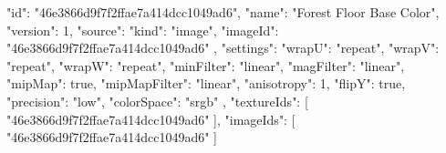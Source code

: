 {
  "id": "46e3866d9f7f2ffae7a414dcc1049ad6",
  "name": "Forest Floor Base Color",
  "version": 1,
  "source": {
    "kind": "image",
    "imageId": "46e3866d9f7f2ffae7a414dcc1049ad6"
  },
  "settings": {
    "wrapU": "repeat",
    "wrapV": "repeat",
    "wrapW": "repeat",
    "minFilter": "linear",
    "magFilter": "linear",
    "mipMap": true,
    "mipMapFilter": "linear",
    "anisotropy": 1,
    "flipY": true,
    "precision": "low",
    "colorSpace": "srgb"
  },
  "textureIds": [
    "46e3866d9f7f2ffae7a414dcc1049ad6"
  ],
  "imageIds": [
    "46e3866d9f7f2ffae7a414dcc1049ad6"
  ]
}
